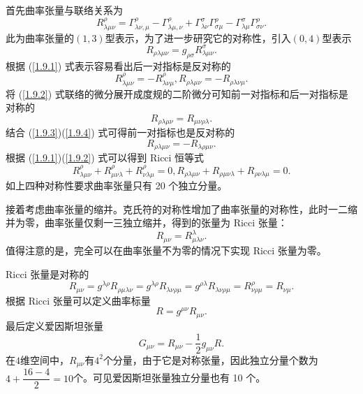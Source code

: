\documentclass[11pt, a4paper, oneside, onecolumn]{ctexart}
\numberwithin{equation}{subsection}
\begin{document}
首先曲率张量与联络关系为
\begin{equation}
R_{\lambda\mu\nu}^{\rho}=\Gamma_{\lambda\nu,\mu}^{\rho}-\Gamma_{\lambda\mu,\nu}^{\rho}+\Gamma_{\lambda\nu}^{\sigma}\Gamma_{\sigma\mu}^{\rho}-\Gamma_{\lambda\mu}^{\sigma}\Gamma_{\sigma\nu}^{\rho}.\label{1.9.1}
\end{equation}
此为曲率张量的$(1,3)$型表示，为了进一步研究它的对称性，引入$\left(0,4\right)$型表示
\begin{equation}
R_{\rho\lambda\mu\nu}=g_{\rho\sigma}R^{\sigma}_{\lambda\mu\nu}.\label{1.9.2}
\end{equation}
根据 (\ref{1.9.1}) 式表示容易看出后一对指标是反对称的
\begin{equation}
R_{\lambda\mu\nu}^{\rho}=-R_{\lambda\nu\mu}^{\rho},R_{\rho\lambda\mu\nu}=-R_{\rho\lambda\nu\mu}.\label{1.9.3}
\end{equation}
将 (\ref{1.9.2}) 式联络的微分展开成度规的二阶微分可知前一对指标和后一对指标是对称的
\begin{equation}
R_{\rho\lambda\mu\nu}=R_{\mu\nu\rho\lambda}.\label{1.9.4}
\end{equation}
结合 (\ref{1.9.3})(\ref{1.9.4}) 式可得前一对指标也是反对称的
\begin{equation}
R_{\rho\lambda\mu\nu}=-R_{\lambda\rho\mu\nu}.
\end{equation}
根据 (\ref{1.9.1})(\ref{1.9.2}) 式可以得到 Ricci 恒等式
\begin{equation}
R_{\lambda\mu\nu}^{\rho}+R_{\mu\nu\lambda}^{\rho}+R_{\nu\lambda\mu}^{\rho}=0,R_{\rho\lambda\mu\nu}+R_{\rho\mu\nu\lambda}+R_{\rho\nu\lambda\mu}=0.
\end{equation}
如上四种对称性要求曲率张量只有 20 个独立分量。

接着考虑曲率张量的缩并。克氏符的对称性增加了曲率张量的对称性，此时一二缩并为零，曲率张量仅剩一三独立缩并，得到的张量为 Ricci 张量：
\begin{equation}
R_{\mu\nu}=R^{\lambda}_{\mu\lambda\nu}.
\end{equation}
值得注意的是，完全可以在曲率张量不为零的情况下实现 Ricci 张量为零。

Ricci 张量是对称的
\begin{equation}
R_{\mu\nu}=g^{\lambda\rho}R_{\rho\mu\lambda\nu}=g^{\lambda\rho}R_{\lambda\nu\rho\mu}=g^{\rho\lambda}R_{\lambda\nu\rho\mu}=R^{\rho}_{\nu\rho\mu}=R_{\nu\mu}.
\end{equation}
根据 Ricci 张量可以定义曲率标量
\begin{equation}
R=g^{\mu\nu}R_{\mu\nu}.
\end{equation}
最后定义爱因斯坦张量
\begin{equation}
G_{\mu\nu}=R_{\mu\nu}-\frac12g_{\mu\nu}R.
\end{equation}
在$4$维空间中，$R_{\mu\nu}$有$4^{2}$个分量，由于它是对称张量，因此独立分量个数为$4+\dfrac{16-4}{2}=10$个。可见爱因斯坦张量独立分量也有 10 个。
\end{document}
